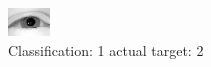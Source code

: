 \begin{figure}[h!]
\begin{center}
\includegraphics[width=0.60\columnwidth]{figures/ID2323_class_1_target_2.png}
\end{center}
\caption{ Classification: 1 actual target: 2}
\label{fig:ID2323_class_1_target_2}
\end{figure}
